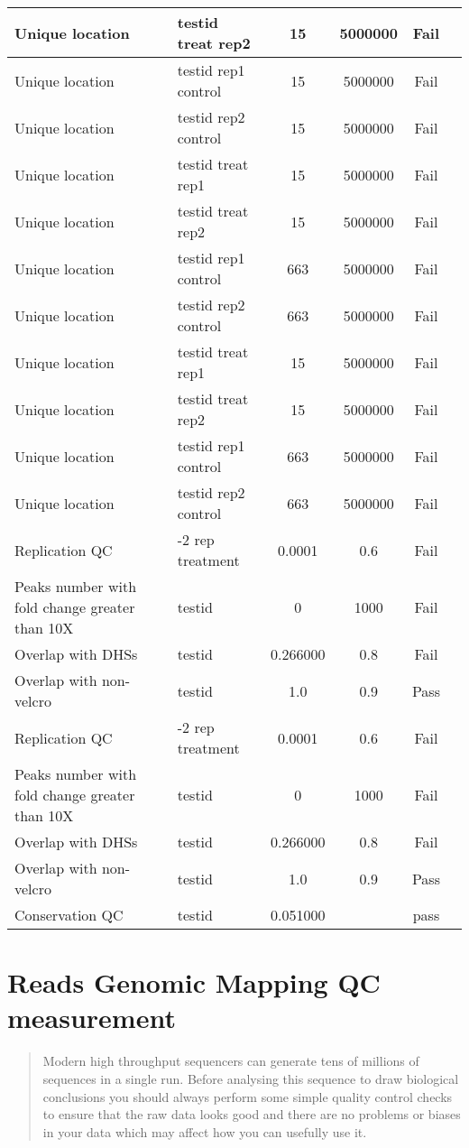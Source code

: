 \documentclass[11pt,a4paper]{article}
\begin{document}
\begin{table}[h]
\begin{tabularx}{\textwidth}{ |X|X|c|c|c|c| }
\hline
Unique location & testid treat rep2 & 15 & 5000000 & Fail \\
\hline
Unique location & testid rep1 control & 15 & 5000000 & Fail \\
\hline
Unique location & testid rep2 control & 15 & 5000000 & Fail \\
\hline
Unique location & testid treat rep1 & 15 & 5000000 & Fail \\
\hline
Unique location & testid treat rep2 & 15 & 5000000 & Fail \\
\hline
Unique location & testid rep1 control & 663 & 5000000 & Fail \\
\hline
Unique location & testid rep2 control & 663 & 5000000 & Fail \\
\hline
Unique location & testid treat rep1 & 15 & 5000000 & Fail \\
\hline
Unique location & testid treat rep2 & 15 & 5000000 & Fail \\
\hline
Unique location & testid rep1 control & 663 & 5000000 & Fail \\
\hline
Unique location & testid rep2 control & 663 & 5000000 & Fail \\
\hline
Replication QC & -2 rep treatment & 0.0001 & 0.6 & Fail \\
\hline
Peaks number with fold change greater than 10X   & testid & 0 & 1000 & Fail \\
\hline
Overlap with DHSs   & testid & 0.266000 & 0.8 & Fail \\
\hline
Overlap with non-velcro  & testid & 1.0 & 0.9 & Pass \\
\hline
Replication QC & -2 rep treatment & 0.0001 & 0.6 & Fail \\
\hline
Peaks number with fold change greater than 10X   & testid & 0 & 1000 & Fail \\
\hline
Overlap with DHSs   & testid & 0.266000 & 0.8 & Fail \\
\hline
Overlap with non-velcro  & testid & 1.0 & 0.9 & Pass \\
\hline
Conservation QC & testid & 0.051000 &   & pass \\
\hline
\end{tabularx}
\end{table}
\newpage
\section{Reads Genomic Mapping QC measurement}
\begin{quotation}
Modern high throughput sequencers can generate tens of millions of sequences in a single run. Before analysing this sequence to draw biological conclusions you should always perform some simple quality control checks to ensure that the raw data looks good and there are no problems or biases in your data which may affect how you can usefully use it.
\end{quotation} 
\end{document}

